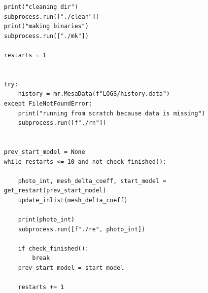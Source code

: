 \documentclass[a4paper,10pt]{article}
\begin{document}
\begin{full}
\begin{verbatim}
print("cleaning dir")
subprocess.run(["./clean"])
print("making binaries")
subprocess.run(["./mk"])

restarts = 1


try:
    history = mr.MesaData(f"LOGS/history.data")
except FileNotFoundError:
    print("running from scratch because data is missing")
    subprocess.run([f"./rn"])


prev_start_model = None
while restarts <= 10 and not check_finished():

    photo_int, mesh_delta_coeff, start_model = get_restart(prev_start_model)
    update_inlist(mesh_delta_coeff)

    print(photo_int)
    subprocess.run([f"./re", photo_int])

    if check_finished():
        break
    prev_start_model = start_model

    restarts += 1
\end{verbatim}
\end{full}
\end{document}
